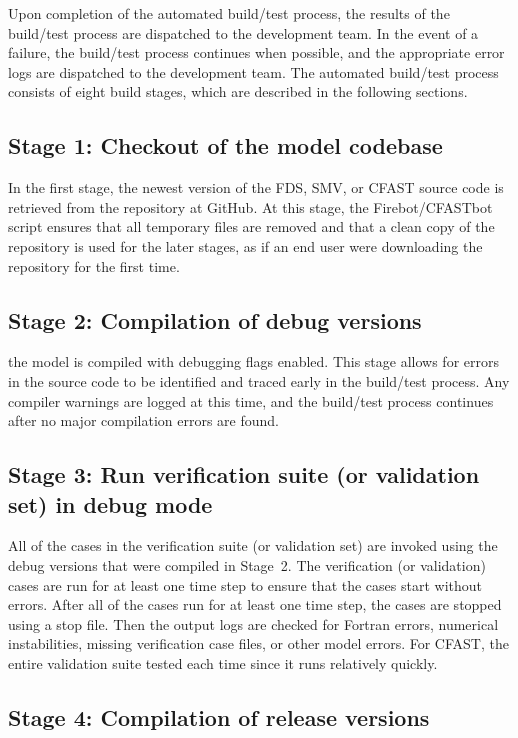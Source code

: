 \documentclass[11pt]{book}
\begin{document}
Upon completion of the automated build/test process, the results of the build/test process are dispatched to the development team. In the event of a failure, the build/test process continues when possible, and the appropriate error logs are dispatched to the development team. The automated build/test process consists of eight build stages, which are described in the following sections.

\subsection*{Stage 1: Checkout of the model codebase}

In the first stage, the newest version of the FDS, SMV, or CFAST source code is retrieved from the repository at GitHub. At this stage, the Firebot/CFASTbot script ensures that all temporary files are removed and that a clean copy of the repository is used for the later stages, as if an end user were downloading the repository for the first time.

\subsection*{Stage 2: Compilation of debug versions}

the model is compiled with debugging flags enabled. This stage allows for errors in the source code to be identified and traced early in the build/test process. Any compiler warnings are logged at this time, and the build/test process continues after no major compilation errors are found.

\subsection*{Stage 3: Run verification suite (or validation set) in debug mode}

All of the cases in the verification suite (or validation set) are invoked using the debug versions that were compiled in Stage~2. The verification (or validation) cases are run for at least one time step to ensure that the cases start without errors. After all of the cases run for at least one time step, the cases are stopped using a stop file. Then the output logs are checked for Fortran errors, numerical instabilities, missing verification case files, or other model errors. For CFAST, the entire validation suite tested each time since it runs relatively quickly.

\subsection*{Stage 4: Compilation of release versions}
\end{document}
